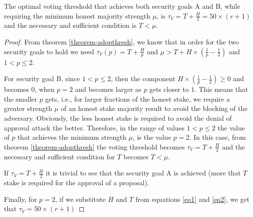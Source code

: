 \begin{lemma} \label{lemma-all-in-one}
The optimal voting threshold that achieves both security goals A and B, while requiring the minimum honest majority strength $\mu$, is $\tau_V = T + \frac{H}{2} = 50 \times (r + 1)$ and the necessary and sufficient condition is $T < \mu$.
\end{lemma}
\begin{proof}
From theorem \ref{theorem-adopthresh}, we know that in order for the two security goals to hold we need $\tau_V(p) = T + \frac{H}{p}$ and $\mu > T + H \times (\frac{1}{p} - \frac{1}{2})$ and $1 < p \leq 2$.

For security goal B, since $1 < p \leq 2$, then the component $H \times (\frac{1}{p} - \frac{1}{2}) \geq 0$ and becomes $0$, when $p = 2$ and becomes larger as $p$ gets closer to $1$. This means that the smaller $p$ gets, i.e., for larger fractions of the honest stake, we require a greater strength $\mu$ of an honest stake majority result to avoid the blocking of the adversary. Obviously, the less honest stake is required to avoid the denial of approval attack the better. Therefore, in the range of values $1 < p \leq 2$ the value of $p$ that achieves the minimum strength $\mu$, is the value $p = 2$. In this case, from theorem \ref{theorem-adopthresh} the voting threshold becomes $\tau_V = T + \frac{H}{2}$ and the necessary and sufficient condition for $T$ becomes $T < \mu$.

If $\tau_V = T + \frac{H}{2}$ it is trivial to see that the security goal A is achieved (more that $T$ stake is required for the approval of a proposal).

Finally, for $p=2$, if we substitute $H$ and $T$ from equations \ref{eq1} and \ref{eq2}, we get that $\tau_V = 50 \times (r + 1)$
\end{proof}


